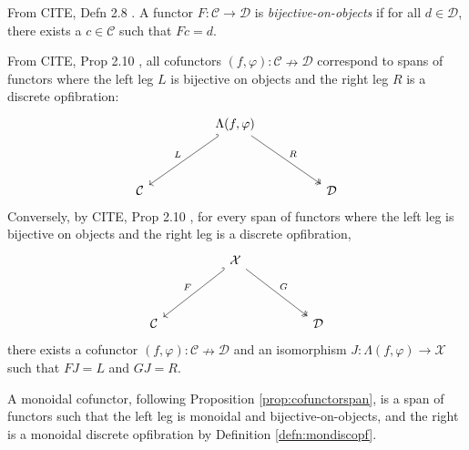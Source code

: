 
\begin{defn}\label{defn:bijonobj}
From \bR CITE, Defn 2.8 \e. A functor $F: \mathcal{C} \rightarrow \mathcal{D}$ is \emph{bijective-on-objects} if for all $d \in \mathcal{D}$, there exists a $c \in \mathcal{C}$ such that $Fc = d$.
\end{defn}

\begin{proposition}\label{prop:cofunctorspan}
From \bR CITE, Prop 2.10 \e, all cofunctors $(f,\varphi):\mathcal{C} \nrightarrow \mathcal{D}$ correspond to spans of functors where the left leg $L$ is bijective on objects and the right leg $R$ is a discrete opfibration:
\[\begin{tikzcd}[ampersand replacement=\&]
	\&\& {\Lambda(f,\varphi)} \\
	\\
	{\mathcal{C}} \&\&\&\& {\mathcal{D}}
	\arrow["L"', hook', from=1-3, to=3-1]
	\arrow["R", two heads, from=1-3, to=3-5]
\end{tikzcd}\]
Conversely, by \bR CITE, Prop 2.10 \e, for every span of functors where the left leg is bijective on objects and the right leg is a discrete opfibration,
\[\begin{tikzcd}[ampersand replacement=\&]
	\&\& {\mathcal{X}} \\
	\\
	{\mathcal{C}} \&\&\&\& {\mathcal{D}}
	\arrow["F"', hook', from=1-3, to=3-1]
	\arrow["G", two heads, from=1-3, to=3-5]
\end{tikzcd}\]
there exists a cofunctor $(f,\varphi):\mathcal{C} \nrightarrow \mathcal{D}$ and an isomorphism $J: \Lambda(f,\varphi) \rightarrow \mathcal{X}$ such that $FJ = L$ and $GJ = R$.
\end{proposition}

\begin{defn}
A monoidal cofunctor, following Proposition \ref{prop:cofunctorspan}, is a span of functors such that the left leg is monoidal and bijective-on-objects, and the right is a monoidal discrete opfibration by Definition \ref{defn:mondiscopf}.
\end{defn}

